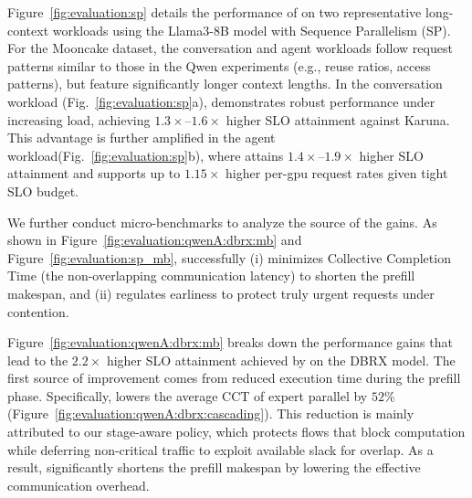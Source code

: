 
Figure~\ref{fig:evaluation:sp} details the performance of \sys{} on two representative long-context workloads using the Llama3-8B model with Sequence Parallelism (SP). For the Mooncake dataset, the conversation and agent workloads follow request patterns similar to those in the Qwen experiments (e.g., reuse ratios, access patterns), but feature significantly longer context lengths. In the conversation workload (Fig.~\ref{fig:evaluation:sp}a), \sys{} demonstrates robust performance under increasing load, achieving $1.3\times$--$1.6\times$ higher SLO attainment against Karuna. This advantage is further amplified in the agent workload(Fig.~\ref{fig:evaluation:sp}b), where \sys{} attains $1.4\times$--$1.9\times$ higher SLO attainment and supports up to $1.15\times$ higher per-gpu request rates given tight SLO budget.

 We further conduct micro-benchmarks to analyze the source of the gains. As shown in Figure~\ref{fig:evaluation:qwenA:dbrx:mb} and Figure~\ref{fig:evaluation:sp_mb}, \sys{} successfully (i) minimizes Collective Completion Time (the non-overlapping communication latency) to shorten the prefill makespan, and (ii) regulates earliness to protect truly urgent requests under contention.

Figure~\ref{fig:evaluation:qwenA:dbrx:mb} breaks down the performance gains that lead to the $2.2\times$ higher SLO attainment achieved by \sys{} on the DBRX model.
The first source of improvement comes from reduced execution time during the prefill phase. Specifically, \sys{} lowers the average CCT of expert parallel by $52\%$ (Figure~\ref{fig:evaluation:qwenA:dbrx:cascading}). This reduction is mainly attributed to our stage-aware policy, which protects flows that block computation while deferring non-critical traffic to exploit available slack for overlap.
As a result, \sys{} significantly shortens the prefill makespan by lowering the effective communication overhead.





